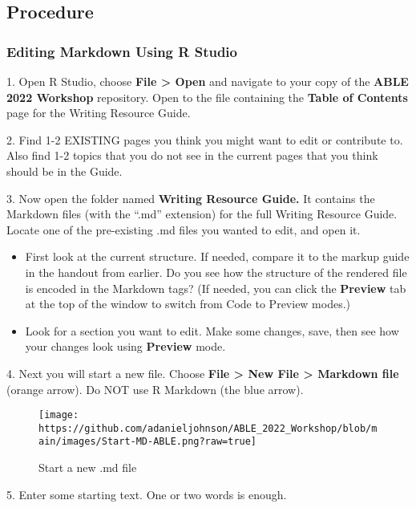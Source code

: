 \documentclass[
]{article}
\providecommand{\tightlist}{%
  \setlength{\itemsep}{0pt}\setlength{\parskip}{0pt}}
\begin{document}
\hypertarget{procedure-1}{%
\subsection{Procedure}\label{procedure-1}}

\hypertarget{editing-markdown-using-r-studio}{%
\subsubsection{Editing Markdown Using R
Studio}\label{editing-markdown-using-r-studio}}

1. Open R Studio, choose \textbf{File \textgreater{} Open} and navigate
to your copy of the \textbf{ABLE 2022 Workshop} repository. Open to the
file containing the \textbf{Table of Contents} page for the Writing
Resource Guide.

2. Find 1-2 EXISTING pages you think you might want to edit or
contribute to. Also find 1-2 topics that you do not see in the current
pages that you think should be in the Guide.

3. Now open the folder named \textbf{Writing Resource Guide.} It
contains the Markdown files (with the ``.md'' extension) for the full
Writing Resource Guide. Locate one of the pre-existing .md files you
wanted to edit, and open it.

\begin{itemize}
\tightlist
\item
  First look at the current structure. If needed, compare it to the
  markup guide in the handout from earlier. Do you see how the structure
  of the rendered file is encoded in the Markdown tags? (If needed, you
  can click the \textbf{Preview} tab at the top of the window to switch
  from Code to Preview modes.)
\item
  Look for a section you want to edit. Make some changes, save, then see
  how your changes look using \textbf{Preview} mode.
\end{itemize}

4. Next you will start a new file. Choose \textbf{File \textgreater{}
New File \textgreater{} Markdown file} (orange arrow). Do NOT use R
Markdown (the blue arrow).

\begin{figure}
\centering
\texttt{[image: https://github.com/adanieljohnson/ABLE\_2022\_Workshop/blob/main/images/Start-MD-ABLE.png?raw=true]}
\caption{Start a new .md file}
\end{figure}

5. Enter some starting text. One or two words is enough.
\end{document}
